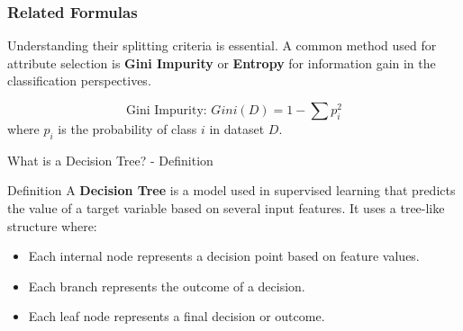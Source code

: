 \documentclass[aspectratio=169]{beamer}
\begin{document}
\begin{frame}[fragile]
    \frametitle{Related Formulas}
    Understanding their splitting criteria is essential. A common method used for attribute selection is \textbf{Gini Impurity} or \textbf{Entropy} for information gain in the classification perspectives.
    
    \begin{equation}
        \text{Gini Impurity: } Gini(D) = 1 - \sum p_i^2
    \end{equation}
    where \( p_i \) is the probability of class \( i \) in dataset \( D \).
\end{frame}

\begin{frame}[fragile]{What is a Decision Tree? - Definition}
    \begin{block}{Definition}
        A \textbf{Decision Tree} is a model used in supervised learning that predicts the value of a target variable based on several input features. 
        It uses a tree-like structure where:
        \begin{itemize}
            \item Each internal node represents a decision point based on feature values.
            \item Each branch represents the outcome of a decision.
            \item Each leaf node represents a final decision or outcome.
        \end{itemize}
    \end{block}
\end{frame}
\end{document}
